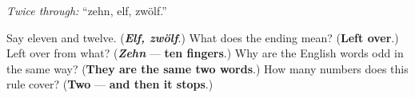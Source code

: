 \emph{Twice through:} \textquotedblleft{}zehn, elf, zwölf.\textquotedblright{}

\begin{tcolorbox}[breakable,colback=teal!4,colframe=teal!35!black,title={Before you move on}]
Say eleven and twelve. (\emph{\textbf{Elf, zwölf}}.) What does the ending mean? (\textbf{Left over}.) Left over from what? (\emph{\textbf{Zehn}} — \textbf{ten fingers}.) Why are the English words odd in the same way? (\textbf{They are the same two words}.) How many numbers does this rule cover? (\textbf{Two} — \textbf{and then it stops}.)
\end{tcolorbox}
